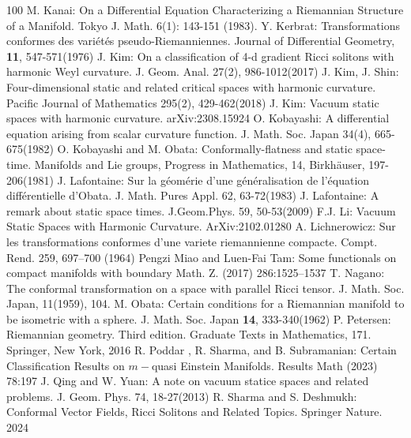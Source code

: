 \documentclass[10pt,leqno,oneside]{amsart}
\begin{document}
{\begin{thebibliography}{100}
       M. Kanai: On a Differential Equation Characterizing a Riemannian Structure of a Manifold. Tokyo J. Math. 6(1): 143-151 (1983).
       Y. Kerbrat: Transformations conformes des vari\'et\'es  pseudo-Riemanniennes. Journal of Differential Geometry, {\bf 11}, 547-571(1976)
       J. Kim: On a classification of 4-d gradient Ricci solitons with harmonic Weyl curvature. J. Geom. Anal. 27(2), 986-1012(2017)
       J. Kim, J. Shin: Four-dimensional static and related critical spaces with harmonic curvature. Pacific Journal of Mathematics 295(2), 429-462(2018)
       J. Kim: Vacuum static spaces with harmonic curvature. arXiv:2308.15924
       O. Kobayashi: A differential equation arising from scalar curvature function. J. Math. Soc. Japan 34(4), 665-675(1982)
       O. Kobayashi and M. Obata: Conformally-flatness and static space-time. Manifolds and Lie groups, Progress in Mathematics, 14, Birkh\"auser, 197-206(1981)
       J. Lafontaine: Sur la g\'eom\'erie d'une g\'en\'eralisation de l'\'equation diff\'erentielle d'Obata. J. Math. Pures Appl. 62, 63-72(1983)
       J. Lafontaine: A remark about static space times. J.Geom.Phys. 59, 50-53(2009)
       F.J. Li: Vacuum Static Spaces with Harmonic Curvature. ArXiv:2102.01280
       A. Lichnerowicz: Sur les transformations conformes d’une variete riemannienne compacte. Compt. Rend. 259, 697–700 (1964)
       Pengzi Miao and Luen-Fai Tam: Some functionals on compact manifolds with boundary Math. Z. (2017) 286:1525–1537
       T. Nagano: The conformal transformation on a space with parallel Ricci tensor. J. Math. Soc. Japan, 11(1959), 104.
       M. Obata: Certain conditions for a Riemannian manifold to be isometric with a sphere. J. Math. Soc. Japan {\bf 14}, 333-340(1962)
       P. Petersen: Riemannian geometry.  {Third edition. Graduate Texts in Mathematics, 171. Springer, New York, 2016}
       R. Poddar , R. Sharma, and B. Subramanian: Certain Classification Results on $m-$quasi Einstein Manifolds. Results Math (2023) 78:197
       J. Qing and W. Yuan: A note on vacuum statice spaces and related problems. J. Geom. Phys. 74, 18-27(2013)
       R. Sharma and S. Deshmukh: Conformal Vector Fields, Ricci Solitons and Related Topics. Springer Nature. 2024

\end{thebibliography}}
\end{document}
